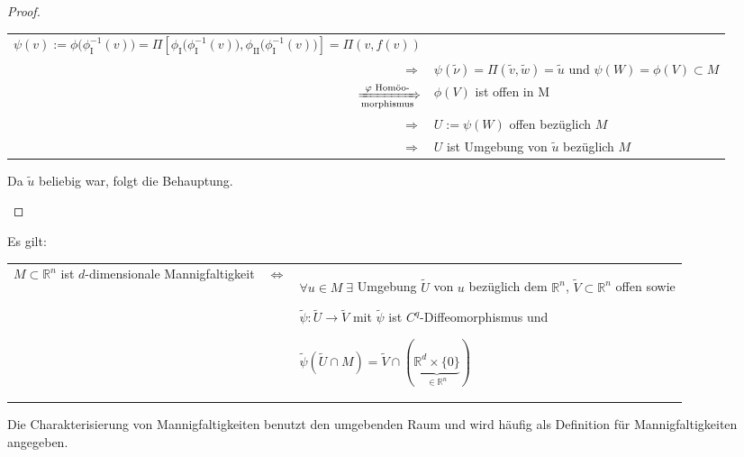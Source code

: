 \begin{proof}
\begin{itemize}
\begin{tabularx}{\linewidth}{r@{\ }X}
			\vspace*{1mm}
			\hspace*{1em} $\psi(v) := \phi\big(\phi_{\text{I}}^{-1}(v)\big) = \Pi\left[\phi_{\text{I}}\big(\phi_{\text{I}}^{-1}(v)\big),\phi_{\text{II}}\big(\phi_{\text{I}}^{-1}(v)\big)\right] = \Pi(v, f(v))$
			 \\
			$\Rightarrow$ & $\psi(\tilde{\nu}) = \Pi(\tilde{v}, \tilde{w}) = \tilde{u}$ und $\psi(W) = \phi(V)\subset M$ \\
			$\xRightarrow[\text{morphismus}]{\phi \text{ Homöo-}}$ & $\phi(V)$ ist offen in M \\
			$\Rightarrow$ & $U := \psi(W)$ offen bezüglich $M$ \\
			$\Rightarrow$ &$U$ ist Umgebung von $\tilde{u}$ bezüglich $M$
		\end{tabularx}
		Da $\tilde{u}$ beliebig war, folgt die Behauptung.
	\end{itemize}
\end{proof}

\begin{proposition}
	Es gilt:
	
	\begin{tabularx}{\linewidth}{p{5cm}@{\ }c@{\ }X}
	$M\subset \mathbb{R}^n$ ist $d$-dimensionale Mannigfaltigkeit & $\Leftrightarrow$ & $\forall u\in M\;\exists$ Umgebung $\tilde{U}$ von $u$ bezüglich dem $\mathbb{R}^n$, $\tilde{V}\subset\mathbb{R}^n$ offen sowie
	
	$\tilde{\psi}\colon \tilde{U}\to \tilde{V}$ mit $\tilde{\psi}$ ist $C^q$-Diffeomorphismus und
	
	\vspace*{1mm}
	\hspace*{1em}$\tilde{\psi}(\tilde{U}\cap M) = \tilde{V} \cap (\underbrace{\mathbb{R}^d \times \{ 0 \}}_{\in \mathbb{R}^n})$
	\end{tabularx}
\end{proposition}

\begin{underlinedenvironment}[Bemerkung]
	Die Charakterisierung von Mannigfaltigkeiten benutzt den umgebenden Raum und wird häufig als Definition für Mannigfaltigkeiten angegeben.
\end{underlinedenvironment}

